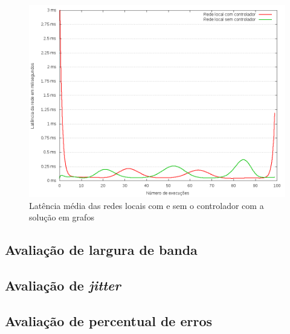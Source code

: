 \begin{figure}[!htb]
    \centering
    \label{fig:local-latency}
    \includegraphics[width=\linewidth]{img/local-latency}
    \caption{Latência média das redes locais com e sem o controlador com a 
    solução em grafos}
\end{figure}

\subsection{Avaliação de largura de banda}


\subsection{Avaliação de \emph{jitter}}


\subsection{Avaliação de percentual de erros}




